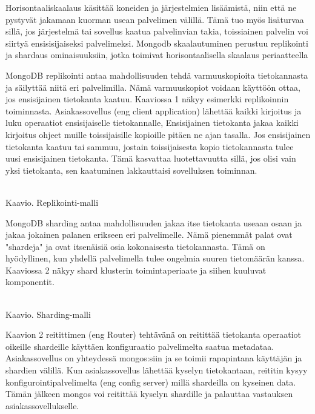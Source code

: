 Horisontaaliskaalaus käsittää koneiden ja järjestelmien lisäämistä, niin että ne pystyvät jakamaan kuorman usean palvelimen välillä.
Tämä tuo myös lisäturvaa sillä, jos järjestelmä tai sovellus kaatua palvelinvian takia, 
toissiainen palvelin voi siirtyä ensisisijaiseksi palvelimeksi. 
Mongodb skaalautuminen perustuu replikointi ja shardaus ominaisuuksiin, jotka toimivat horisontaalisella skaalaus periaatteella 
\medskip




MongoDB replikointi antaa mahdollisuuden tehdä varmuuskopioita tietokannasta ja säilyttää niitä eri palvelimilla.
Nämä varmuuskopiot voidaan käyttöön ottaa, jos ensisijainen tietokanta kaatuu. 
Kaaviossa 1 näkyy esimerkki replikoinnin toiminnasta. 
Asiakassovellus (eng client application) lähettää kaikki kirjoitus ja luku operaatiot ensisijaiselle tietokannalle, 
Ensisijainen tietokanta jakaa kaikki kirjoitus ohjeet muille toissijaisille kopioille pitäen ne ajan tasalla.
Jos ensisijainen tietokanta kaatuu tai sammuu, jostain toissijaisesta kopio tietokannasta tulee uusi ensisijainen tietokanta.
Tämä kasvattaa luotettavuutta sillä, jos olisi vain yksi tietokanta, sen kaatuminen lakkauttaisi sovelluksen toiminnan. 
\medskip
\bigskip

\\
Kaavio\getChartCount{}. Replikointi-malli 
\medskip



MongoDB sharding antaa mahdollisuuden jakaa itse tietokanta useaan osaan ja jakaa jokainen palanen erikseen eri palvelimelle.
Nämä pienemmät palat ovat "shardeja"{} ja ovat itsenäisiä osia kokonaisesta tietokannasta.
Tämä on hyödyllinen, kun yhdellä palvelimella tulee ongelmia suuren tietomäärän kanssa.
Kaaviossa 2 näkyy shard klusterin toimintaperiaate ja siihen kuuluvat komponentit. 
\medskip



\bigskip
\\
Kaavio\getChartCount{}. Sharding-malli 
\medskip




Kaavion 2 reitittimen (eng Router) tehtävänä on reitittää tietokanta operaatiot oikeille shardeille käyttäen konfiguraatio palvelimelta saatua metadataa.
Asiakassovellus on yhteydessä mongos:siin ja se toimii rapapintana käyttäjän ja shardien välillä. 
Kun asiakassovellus lähettää kyselyn tietokantaan, reititin kysyy konfigurointipalvelimelta (eng config server) millä shardeilla on kyseinen data. 
Tämän jälkeen mongos voi reitittää kyselyn shardille ja palauttaa vastauksen asiakassovellukselle.
\medskip

